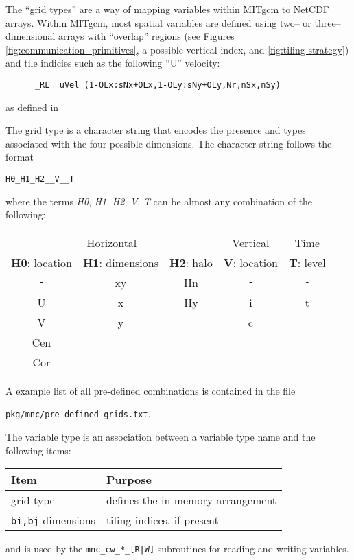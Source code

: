 The ``grid types'' are a way of mapping variables within MITgcm to
NetCDF arrays.  Within MITgcm, most spatial variables are defined
using two-- or three--dimensional arrays with ``overlap'' regions (see
Figures \ref{fig:communication_primitives}, a possible vertical index,
and \ref{fig:tiling-strategy}) and tile indicies such as the following
``U'' velocity:
\begin{verbatim}
      _RL  uVel (1-OLx:sNx+OLx,1-OLy:sNy+OLy,Nr,nSx,nSy)
\end{verbatim}
as defined in 

The grid type is a character string that encodes the presence and
types associated with the four possible dimensions.  The character
string follows the format
\begin{center}
  \texttt{H0\_H1\_H2\_\_V\_\_T}
\end{center}
where the terms \textit{H0}, \textit{H1}, \textit{H2}, \textit{V},
\textit{T} can be almost any combination of the following:
\begin{center}
  \begin{tabular}[h]{|ccc|c|c|}\hline
    \multicolumn{3}{|c|}{Horizontal} & Vertical & Time \\
    \textbf{H0}: location & \textbf{H1}: dimensions & \textbf{H2}: halo 
          & \textbf{V}: location & \textbf{T}: level  \\\hline
    \texttt{-} & xy & Hn & \texttt{-} & \texttt{-} \\
    U  &  x  &  Hy  &  i  &  t  \\
    V  &  y  &      &  c  &     \\
    Cen  &   &      &     &     \\
    Cor  &   &      &     &     \\\hline
  \end{tabular}
\end{center}
A example list of all pre-defined combinations is contained in the
file
\begin{center}
  \texttt{pkg/mnc/pre-defined\_grids.txt}.
\end{center}

The variable type is an association between a variable type name and the
following items:
\begin{center}
  \begin{tabular}[h]{|l|l|}\hline
    \textbf{Item}  & \textbf{Purpose}  \\\hline
    grid type  &  defines the in-memory arrangement  \\
    \texttt{bi,bj} dimensions  &  tiling indices, if present  \\\hline
  \end{tabular}
\end{center}
and is used by the \texttt{mnc\_cw\_*\_[R|W]} subroutines for reading
and writing variables.


